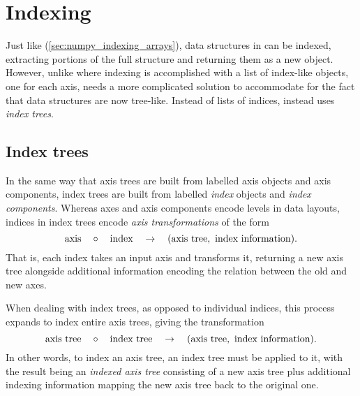 \documentclass[thesis]{subfiles}
\begin{document}
\chapter{Indexing}
\label{chapter:indexing}

Just like \numpy{} (\cref{sec:numpy_indexing_arrays}), data structures in  can be indexed, extracting portions of the full structure and returning them as a new object.
However, unlike \numpy{} where indexing is accomplished with a list of index-like objects, one for each axis,  needs a more complicated solution to accommodate for the fact that data structures are now tree-like.
Instead of lists of indices,  instead uses \emph{index trees}.

\section{Index trees}
\label{sec:index_trees}

In the same way that axis trees are built from labelled axis objects and axis components, index trees are built from labelled \emph{index} objects and \emph{index components}.
Whereas axes and axis components encode levels in data layouts, indices in index trees encode \emph{axis transformations} of the form
\begin{equation}
  \textnormal{axis} \quad \circ \quad \textnormal{index} \quad \to \quad (\textnormal{axis tree},\ \textnormal{index information}).
  \label{eq:index_transform}
\end{equation}
That is, each index takes an input axis and transforms it, returning a new axis tree alongside additional information encoding the relation between the old and new axes.

When dealing with index trees, as opposed to individual indices, this process expands to index entire axis trees, giving the transformation
\begin{equation}
  \label{eq:index_tree_apply}
  \textnormal{axis tree} \quad \circ \quad \textnormal{index tree} \quad \to \quad (\textnormal{axis tree},\ \textnormal{index information}).
\end{equation}
In other words, to index an axis tree, an index tree must be applied to it, with the result being an \emph{indexed axis tree} consisting of a new axis tree plus additional indexing information mapping the new axis tree back to the original one.
\end{document}
